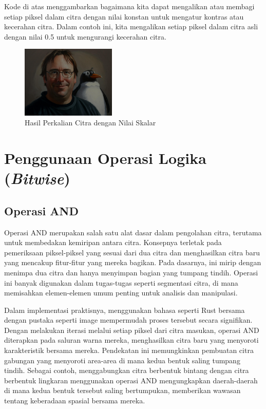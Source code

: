 \documentclass[a4paper,12pt,openany]{book}
\begin{document}
Kode di atas menggambarkan bagaimana kita dapat mengalikan atau membagi setiap piksel dalam citra dengan nilai konstan untuk mengatur kontras atau kecerahan citra. Dalam contoh ini, kita mengalikan setiap piksel dalam citra asli dengan nilai 0.5 untuk mengurangi kecerahan citra.

\begin{figure}[H]
    \centering
    \includegraphics[width=0.4\textwidth]{./image/arithmetic/result-multiplication-scalar.jpg}
    \caption{Hasil Perkalian Citra dengan Nilai Skalar}
\end{figure}

\section{Penggunaan Operasi Logika (\textit{Bitwise})}
\subsection{Operasi AND}

Operasi AND merupakan salah satu alat dasar dalam pengolahan citra, terutama untuk membedakan kemiripan antara citra. Konsepnya terletak pada pemeriksaan piksel-piksel yang sesuai dari dua citra dan menghasilkan citra baru yang mencakup fitur-fitur yang mereka bagikan. Pada dasarnya, ini mirip dengan menimpa dua citra dan hanya menyimpan bagian yang tumpang tindih. Operasi ini banyak digunakan dalam tugas-tugas seperti segmentasi citra, di mana memisahkan elemen-elemen umum penting untuk analisis dan manipulasi.

Dalam implementasi praktisnya, menggunakan bahasa seperti Rust bersama dengan pustaka seperti image mempermudah proses tersebut secara signifikan. Dengan melakukan iterasi melalui setiap piksel dari citra masukan, operasi AND diterapkan pada saluran warna mereka, menghasilkan citra baru yang menyoroti karakteristik bersama mereka. Pendekatan ini memungkinkan pembuatan citra gabungan yang menyoroti area-area di mana kedua bentuk saling tumpang tindih. Sebagai contoh, menggabungkan citra berbentuk bintang dengan citra berbentuk lingkaran menggunakan operasi AND mengungkapkan daerah-daerah di mana kedua bentuk tersebut saling bertumpukan, memberikan wawasan tentang keberadaan spasial bersama mereka.
\end{document}
